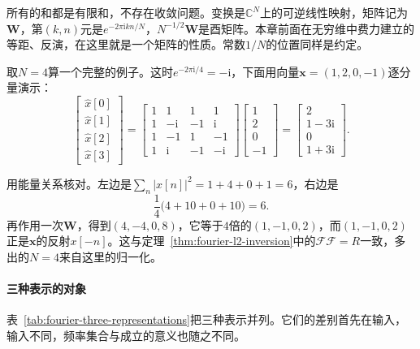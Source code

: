 所有的和都是有限和，不存在收敛问题。变换是$\mathbb C^N$上的可逆线性映射，矩阵记为$\bm W$，第$(k,n)$元是$e^{-2\pi\mathrm ikn/N}$，$N^{-1/2}\bm W$是酉矩阵。本章前面在无穷维中费力建立的等距、反演，在这里就是一个矩阵的性质。常数$1/N$的位置同样是约定。

取$N=4$算一个完整的例子。这时$e^{-2\pi\mathrm i/4}=-\mathrm i$，下面用向量$\bm x=(1,2,0,-1)$逐分量演示：
\[
\begin{bmatrix}\widehat x[0]\\\widehat x[1]\\\widehat x[2]\\\widehat x[3]\end{bmatrix}
=\begin{bmatrix}1&1&1&1\\1&-\mathrm i&-1&\mathrm i\\1&-1&1&-1\\1&\mathrm i&-1&-\mathrm i\end{bmatrix}
\begin{bmatrix}1\\2\\0\\-1\end{bmatrix}
=\begin{bmatrix}2\\1-3\mathrm i\\0\\1+3\mathrm i\end{bmatrix}.
\]

用能量关系核对。左边是$\sum_n\lvert x[n]\rvert^2=1+4+0+1=6$，右边是
\[
\frac14\bigl(4+10+0+10\bigr)=6.
\]
再作用一次$\bm W$，得到$(4,-4,0,8)$，它等于$4$倍的$(1,-1,0,2)$，而$(1,-1,0,2)$正是$\bm x$的反射$x[-n]$。这与定理~\ref{thm:fourier-l2-inversion}中的$\mathcal F\mathcal F=R$一致，多出的$N=4$来自这里的归一化。

\paragraph{三种表示的对象}

表~\ref{tab:fourier-three-representations}把三种表示并列。它们的差别首先在输入，输入不同，频率集合与成立的意义也随之不同。

